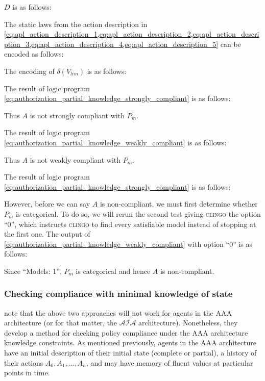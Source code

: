 $D$ is as follows:


The static laws from the action description in \cref{eq:apl_action_description_1,eq:apl_action_description_2,eq:apl_action_description_3,eq:apl_action_description_4,eq:apl_action_description_5} can be encoded as follows:


The encoding of $\delta(V_{lim})$ is as follows:


%

The result of logic program \cref{eq:authorization_partial_knowledge_strongly_compliant} is as follows:

Thus $A$ is not strongly compliant with $P_m$.

The result of logic program \cref{eq:authorization_partial_knowledge_weakly_compliant} is as follows:

Thus $A$ is not weakly compliant with $P_m$.

The result of logic program \cref{eq:authorization_partial_knowledge_strongly_compliant} is as follows:

However, before we can say $A$ is non-compliant, we must first determine whether $P_m$ is categorical.
To do so, we will rerun the second test giving \textsc{clingo} the option ``0'', which instructs \textsc{clingo} to find every satisfiable model instead of stopping at the first one.
The output of \cref{eq:authorization_partial_knowledge_weakly_compliant} with option ``0'' is as follows:

Since ``Models: 1'', $P_m$ is categorical and hence $A$ is non-compliant.

\subsubsection{Checking compliance with minimal knowledge of state}

\citet{gelfond_authorization_2008} note that the above two approaches will not work for agents in the AAA architecture (or for that matter, the $\mathcal{AIA}$ architecture).
Nonetheless, they develop a method for checking policy compliance under the AAA architecture knowledge constraints.
As mentioned previously, agents in the AAA architecture have an initial description of their initial state (complete or partial), a history of their actions $A_0, A_1, \dots, A_n$, and may have memory of fluent values at particular points in time.

